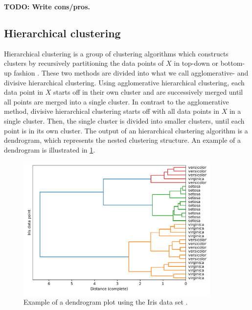 \textbf{TODO: Write cons/pros.}

\subsection{Hierarchical clustering}
Hierarchical clustering is a group of clustering algorithms which constructs clusters by recursively partitioning the data points of $X$ in top-down or bottom-up fashion \cite{Rokach2005}. These two methods are divided into what we call agglomerative- and divisive hierarchical clustering. Using agglomerative hierarchical clustering, each data point in $X$ starts off in their own cluster and are successively merged until all points are merged into a single cluster. In contrast to the agglomerative method, divisive hierarchical clustering starts off with all data points in $X$ in a single cluster. Then, the single cluster is divided into smaller clusters, until each point is in its own cluster. The output of an hierarchical clustering algorithm is a dendrogram, which represents the nested clustering structure. An example of a dendrogram is illustrated in \cref{fig:dendrogram-example}.
\begin{figure}[H]
    \centering
    \includegraphics[width=0.9\textwidth]{thesis/figures/dendrogram-example.pdf}
    \caption{Example of a dendrogram plot using the Iris data set \cite{Fisher1936}.}
    \label{fig:dendrogram-example}
\end{figure}


